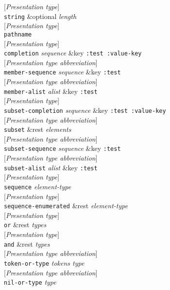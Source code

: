 \documentclass[10pt]{book}
\newenvironment{defother}[2]{[\textit{#1}]\\\texttt{#2}}{\\}
\begin{document}
\begin{defother}{Presentation type}{string} \&optional \textit{length}\end{defother}
\begin{defother}{Presentation type}{pathname}\end{defother}
\begin{defother}{Presentation type}{completion}  \textit{sequence} \&key \texttt{:test :value-key}\end{defother}
\begin{defother}{Presentation type abbreviation}{member-sequence} \textit{sequence} \&key \texttt{:test}\end{defother}
\begin{defother}{Presentation type abbreviation}{member-alist} \textit{alist} \&key \texttt{:test}\end{defother}
\begin{defother}{Presentation type}{subset-completion} \textit{sequence} \&key \texttt{:test :value-key}\end{defother}
\begin{defother}{Presentation type abbreviation}{subset} \&rest \textit{elements} \end{defother}
\begin{defother}{Presentation type abbreviation}{subset-sequence} \textit{sequence} \&key \texttt{:test}\end{defother}
\begin{defother}{Presentation type abbreviation}{subset-alist} \textit{alist} \&key \texttt{:test}\end{defother}
\begin{defother}{Presentation type}{sequence} \textit{element-type} \end{defother}
\begin{defother}{Presentation type}{sequence-enumerated} \&rest \textit{element-type}\end{defother}
\begin{defother}{Presentation type}{or} \&rest \textit{types} \end{defother}
\begin{defother}{Presentation type}{and} \&rest \textit{types} \end{defother}
\begin{defother}{Presentation type abbreviation}{token-or-type} \textit{tokens type}\end{defother}
\begin{defother}{Presentation type abbreviation}{nil-or-type} \textit{type} \end{defother}
\end{document}
